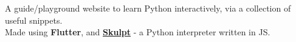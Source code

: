 \documentclass[]{resume}
\begin{document}
\begin{minipage}[t]{0.62\textwidth}
A guide/playground website to learn Python interactively, via a collection of useful snippets.\\
Made using \textbf{Flutter}, and \href{https://skulpt.org}{\textbf{Skulpt}} - a Python interpreter written in JS.
\sectionsep





% 
% 


\end{minipage} 
\end{document}
